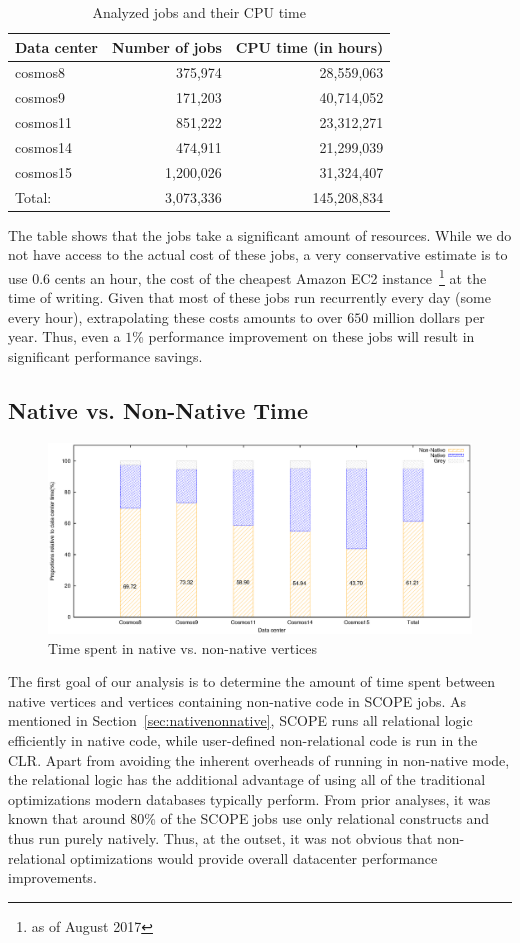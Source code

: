 \begin{table}[ht]
\centering
\begin{tabular}{lrr}
  Data center & Number of jobs & CPU time (in hours) \\
 \midrule
cosmos8 & 375,974 &  28,559,063 \\
cosmos9 & 171,203 &  40,714,052 \\
cosmos11 & 851,222 & 23,312,271\\
cosmos14 & 474,911 & 21,299,039\\
cosmos15 & 1,200,026&31,324,407 \\
\midrule
Total: & 3,073,336 & 145,208,834\\
\midrule
\end{tabular}
 \caption{Analyzed jobs and their CPU time
\label{tb:projects}}
\end{table}

The table shows that the jobs take a significant amount of resources. 
While we do not have access to the actual cost of these jobs, a very conservative estimate is to use $0.6$ cents an hour, the cost of the cheapest Amazon EC2 instance~\footnote{as of August 2017} at the time of writing. 
Given that most of these jobs run recurrently every day (some every hour), extrapolating these costs amounts to over $650$ million dollars per year. 
Thus, even a $1$\% performance improvement on these jobs will result in significant performance savings. 


\subsection{Native vs. Non-Native Time}
\begin{figure}[ht]
\includegraphics[width=2\columnwidth]{graphs/proportions2}
\caption{Time spent in native vs. non-native vertices}
\label{fig:nativeVsNonNative}
\end{figure}
The first goal of our analysis is to determine the amount of time spent between native vertices and vertices containing non-native code in SCOPE jobs. 
As mentioned in Section~\ref{sec:nativenonnative}, SCOPE runs all relational logic efficiently in native code, while user-defined non-relational code is run in the CLR. 
Apart from avoiding the inherent overheads of running in non-native mode, the relational logic has the additional advantage of using all of the traditional optimizations modern databases typically perform.
From prior analyses, it was known that around $80$\% of the SCOPE jobs  use only relational constructs and thus run purely natively. 
Thus, at the outset, it was not obvious that non-relational optimizations would provide overall datacenter performance improvements. 



